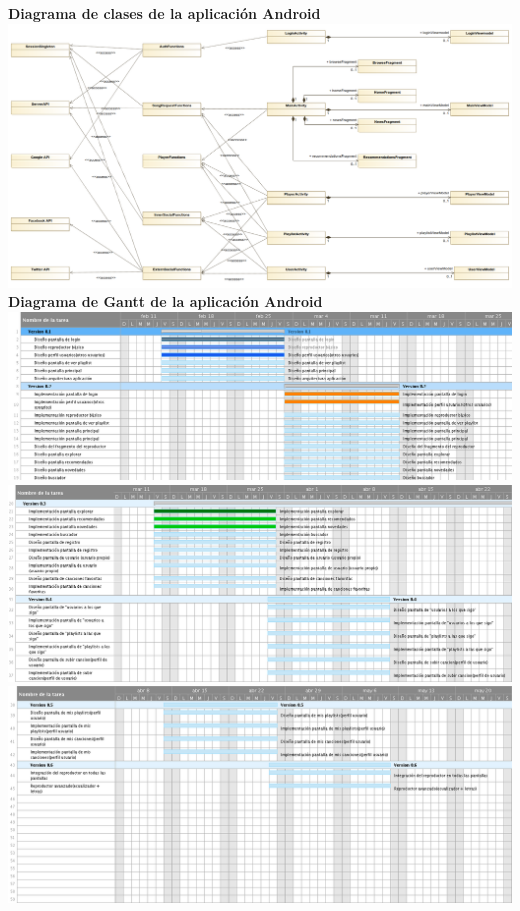 \documentclass[12pt]{article}%
\begin{document}
\textbf{Diagrama de clases de la aplicaci\'on Android}\\
\includegraphics[width=\linewidth]{Figures/android-class.png}\\

\textbf{Diagrama de Gantt de la aplicaci\'on Android}\\
\includegraphics[width=\linewidth]{Figures/gantt-1.png}\\
\includegraphics[width=\linewidth]{Figures/gantt-2.png}\\
\includegraphics[width=\linewidth]{Figures/gantt-3.png}\\
\end{document}
